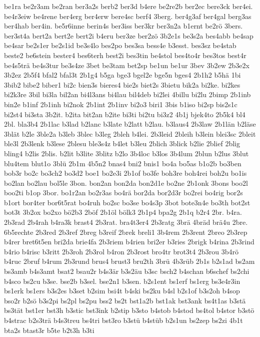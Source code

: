 {be1ra
be2r3am
be2ran
ber3a2s
berb2
ber3d
b4ere
be2re2b
ber2ec
bere3ck
ber4ei.
be4r3eiw
be4rene
ber4erg
ber4erw
bere4sc
berf4
3berg.
ber4g3af
ber4gal
berg3as
ber4hab
ber4in.
be5r6inne
berin4s
ber3iss
ber3kr
ber3n2a
b1ernt
be2rö
3bers.
ber3st4a
bert2a
bert2e
bert2i
b4eru
ber3ze
ber2zö
3b2e1s
be3s2a
bes4abb
be4sap
be4sar
be2s1er
be2s1id
be3s4lo
bes2po
bes3sa
bess4e
b3esst.
bes3sz
be4stab
beste2
be6stein
bester4
bes6terh
best2i
bes3tin
be4stol
bes4to4r
bes3tos
best4r
be4s5trä
be4s3tur
be3s4ze
3bet
be3tam
bet2sp
be1un
be1ur
3bev
3b2ew
2b3e2x
3b2ez
2b5f4
bfal2
bfal3t
2b1g4
b5ga
bge3
bgel2e
bge5n
bges4
2b1h2
b5hä
1bi
3bib2
bibe2
biber1
bi2c
bien3s
bieres4
bie2s
biet2s
3bietu
bik2a
bi2ke.
bi2kes
bi2k3re
3bil
bi3la
bil2an
bi4l3ans
bi4lau
bil4deb
bi2lei
4billu
bi2lu
2bimp
2b1inb
bin2e
b1inf
2b1inh
bi2nok
2b1int
2b1inv
bi2o3
biri1
3bis
b1iso
bi2sp
bis2s1c
bi2st4
bi3sta
3b2it.
b2ita
bit2an
b2ite
bi3ti
bi2tu
bi3z2
4b1j
bjek4to
2b5k4
bl4
2bl.
bla3b4
2b1lac
b3lad
b2lanc
b3late
b2latt
b2lau.
b3laus4
2b3law
2b1län
b2läse
3blät
b2le
3ble2a
b3leb
3blec
b3leg
2bleh
b4lei.
2b3leid
2bleih
b3lein
blei3sc
2bleit
ble3l
2b3lenk
b3lese
2blesu
ble3s4z
b4let
b3leu
2blich
3blick
b2lie
2blief
2blig
bling4
b2lis
2blis.
b2lit
b3lite
3blitz
b2lo
3b4loc
b3los
3b4lum
2blun
b2lus
3blut
blu4tem
blut1o
3blü
2b1m
4b5n2
bnas4
bni2
bnis1
bo4a
bo5as
b1o2b
bo3ben
bob3r
bo2c
bo3ch2
bo3d2
boe1
bo2e3i
2b1of
bo3fe
boh3re
boh4rei
boh2u
bo1is
bo2lan
bo2lau
bol5le
3bon.
bon2an
bon2da
bon2d1e
bo2ne
2b1onk
3bons
boo2l
boo2ti
b1op
3bor.
bo1r2an
bo2r3as
bo4rä
bor2da
bor2d3r
bo2rei
bo4rig
bor2s
b1ort
bor4ter
bor6t5rat
bo4ruh
bo2sc
bo3se
bo4s3p
3bot
bote3n4e
bo3th
bot2st
bot3t
3b2ox
bo2xo
bö2b3
2böf
2b1öl
bölk3
2b1p4
bpa2g
2b1q
b2r4
2br.
b4ra.
2b3rad
2b4rah
b4ra3k
brast4
2b3rat.
bra4t3er4
2b3ratg
3brä
4bräd
brä4u
2bre.
6b5rechte
2b3red
2b3ref
2breg
b3reif
2brek
breli1
3b4rem
2b3rent
2breo
2b3rep
b4rer
bret6t5en
bri2da
brie4fa
2b3riem
b4rien
bri2er
b3ries
2brigk
b4rina
2b3rind
b4rio
b4risc
b3ritt
2b3roh
2b3rol
b4ron
2b3rost
bro4tr
brot3t4
2b3rou
3b4rö
b4ruc
2bruf
b4rum
2b3rund
brus4
brust3
bru2th
3brü
4b3rüb
2b1s
b2s1ad
bs2am
bs3amb
b4s3amt
bsat2
bsau2r
b4s3är
b3s2äu
b3sc
bsch2
b4schan
b6schef
bs2chi
b4sco
bs2cu
b3se.
bse2b
b3sel.
bse2n1
b3sen.
b2s1ent
bs1erf
bs1erg
bs3e4r3in
bs1erk
bs1ers
b3s2es
b3set
b2sim
bsi4t
b4ski
bs2ku
b4sl
b2s1of
b3s2oh
b4sop
bso2r
b2sö
b3s2pi
bs2pl
bs2pu
bss2
bs2t
bst1a2b
bst1ak
bst3ank
bs4t1as
b3stä
bs3tät
bst1er
bst3h
b3stic
bst3ink
b2stip
b3sto
b4stob
b4stod
bs4tol
b4stor
b3stö
b4strac
b2s3trä
b4s3treu
bs4tri
bst3ro
b3stü
b4stüb
b2s1un
bs2zep
bs2zi
4b1t
bta2s
btast3r
b5te
b2t3h
b3ti
}
